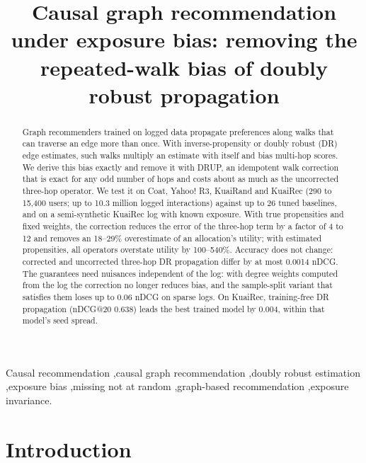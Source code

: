 \documentclass[preprint,review,12pt,authoryear]{elsarticle}
\theoremstyle{definition}
\begin{document}
\begin{frontmatter}

\title{Causal graph recommendation under exposure bias: removing the repeated-walk bias of doubly robust propagation}


\begin{abstract}
Graph recommenders trained on logged data propagate preferences along walks that can traverse an edge more than once. With inverse-propensity or doubly robust (DR) edge estimates, such walks multiply an estimate with itself and bias multi-hop scores. We derive this bias exactly and remove it with DRUP, an idempotent walk correction that is exact for any odd number of hops and costs about as much as the uncorrected three-hop operator. We test it on Coat, Yahoo! R3, KuaiRand and KuaiRec (290 to 15,400 users; up to 10.3 million logged interactions) against up to 26 tuned baselines, and on a semi-synthetic KuaiRec log with known exposure. With true propensities and fixed weights, the correction reduces the error of the three-hop term by a factor of 4 to 12 and removes an 18--29\% overestimate of an allocation's utility; with estimated propensities, all operators overstate utility by 100--540\%. Accuracy does not change: corrected and uncorrected three-hop DR propagation differ by at most 0.0014 nDCG. The guarantees need nuisances independent of the log: with degree weights computed from the log the correction no longer reduces bias, and the sample-split variant that satisfies them loses up to 0.06 nDCG on sparse logs. On KuaiRec, training-free DR propagation (nDCG@20 0.638) leads the best trained model by 0.004, within that model's seed spread.
\end{abstract}

\begin{keyword}
Causal recommendation \sep causal graph recommendation \sep doubly robust estimation \sep exposure bias \sep missing not at random \sep graph-based recommendation \sep exposure invariance.


\end{keyword}

\end{frontmatter}

\section{Introduction}
\end{document}
